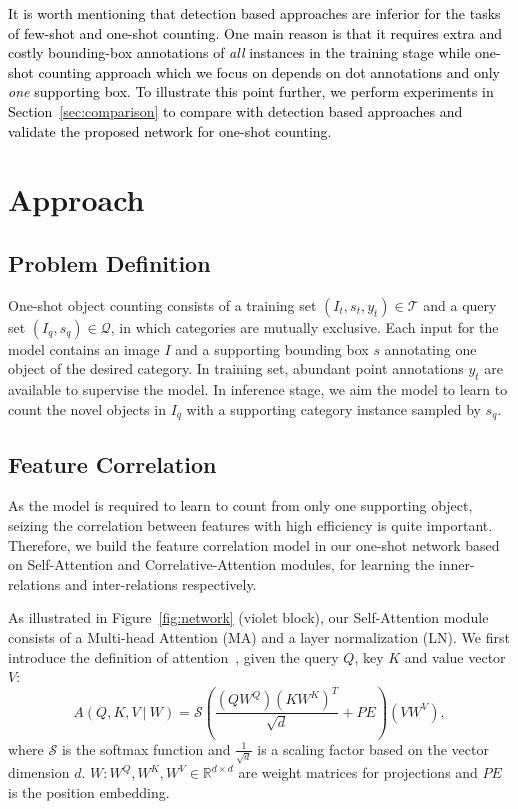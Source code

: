\documentclass{article}
\newcommand\XP[1]{\textcolor{black}{#1}}\newcommand\XPC[1]{\textcolor{black}{[#1]}}
\begin{document}
\XP{It is worth mentioning that detection based approaches \cite{lin2017focal, ren2015faster, he2017mask} are inferior for the tasks of few-shot and one-shot counting. One main reason is that it requires extra and costly bounding-box annotations of \emph{all} instances in the training stage while \XP{one-shot counting approach which we focus on} depends on dot annotations and only \emph{one} supporting box. To illustrate this point further, 
we perform experiments in Section~\ref{sec:comparison} to compare with detection based approaches and validate the proposed network for one-shot counting.}








\section{Approach}

\subsection{Problem Definition}

One-shot object counting consists of a training set $(I_t, s_t, y_t) \in \mathcal{T}$ and a query set $(I_q, s_q) \in \mathcal{Q}$, in which categories are mutually exclusive. Each input for the model contains an image $I$ and a supporting bounding box $s$ annotating one object of the desired category. In training set, abundant point annotations $y_t$ are available to supervise the model. In inference stage, we aim the model to learn to count the novel objects in $I_q$ with a supporting category instance sampled by $s_q$.

\subsection{Feature Correlation}
As the model is required to learn to count from only one supporting object, seizing the correlation between features with high efficiency is quite important. Therefore, we build the feature correlation model in our one-shot network based on Self-Attention and Correlative-Attention modules, for learning the inner-relations and inter-relations respectively. 

As illustrated in Figure~\ref{fig:network} (violet block), our Self-Attention module consists of a Multi-head Attention (MA) and a layer normalization (LN). We first introduce the definition of attention~\cite{vaswani2017attention}, given the query $Q$, key $K$ and value vector $V$:
\begin{equation}
    A(Q, K, V\ |\ W) = \mathcal{S}(\frac{(QW^Q)(KW^K)^T}{\sqrt{d}}+PE)(VW^V),
\end{equation}
where $\mathcal{S}$ is the softmax function and $\frac{1}{\sqrt{d}}$ is a scaling factor based on the vector dimension $d$. $W:W^Q, W^K, W^V \in \mathbb{R}^{d \times d}$ are weight matrices for projections and $PE$ is the position embedding.
\end{document}
